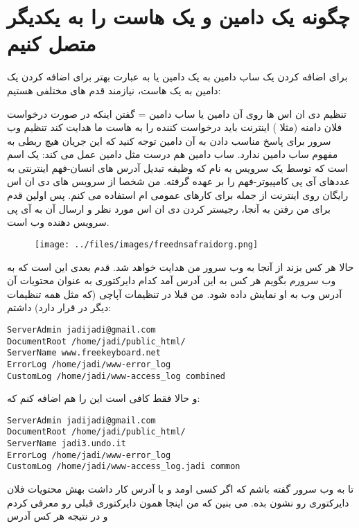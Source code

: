 \section{چگونه یک دامین و یک هاست را به یکدیگر متصل کنیم}
برای اضافه کردن یک ساب دامین به یک دامین یا به عبارت بهتر برای اضافه کردن یک دامین به یک هاست، نیازمند قدم های مختلفی هستیم:

تنظیم دی ان اس ها روی آن دامین یا ساب دامین = گفتن اینکه در صورت درخواست فلان دامنه (مثلا ) اینترنت باید درخواست کننده را به هاست ما هدایت کند
تنظیم وب سرور برای پاسخ مناسب دادن به آن دامین
توجه کنید که این جریان هیچ ربطی به مفهوم ساب دامین ندارد. ساب دامین هم درست مثل دامین عمل می کند: یک اسم است که توسط یک سرویس به نام  که وظیفه تبدیل آدرس های انسان-فهم اینترنتی به عددهای آی پی کامپیوتر-فهم را بر عهده گرفته. من شخصا از سرویس های دی ان اس رایگان روی اینترنت از جمله
\href{http://freedns.afraid.org}{}
  برای کارهای عمومی ام استفاده می کنم. پس اولین قدم برای من رفتن به آنجا، رجیستر کردن دی ان اس مورد نظر و ارسال آن به آی پی سرویس دهنده وب است.
\begin{figure}[H]
\texttt{[image: ../files/images/freednsafraidorg.png]}
\end{figure}
حالا هر کس بزند  از آنجا به وب سرور من هدایت خواهد شد. قدم بعدی این است که به وب سرورم بگویم هر کس به این آدرس آمد کدام دایرکتوری به عنوان محتویات آن آدرس وب به او نمایش داده شود. من قبلا در تنظیمات آپاچی (که مثل همه تنظیمات دیگر در
 قرار دارد) داشتم:
\begin{frameng}
\begin{lstlisting}
ServerAdmin jadijadi@gmail.com
DocumentRoot /home/jadi/public_html/
ServerName www.freekeyboard.net 
ErrorLog /home/jadi/www-error_log
CustomLog /home/jadi/www-access_log combined
\end{lstlisting}
\end{frameng}
و حالا فقط کافی است این را هم اضافه کنم که:
\begin{frameng}
\begin{lstlisting}
ServerAdmin jadijadi@gmail.com
DocumentRoot /home/jadi/public_html/
ServerName jadi3.undo.it
ErrorLog /home/jadi/www-error_log
CustomLog /home/jadi/www-access_log.jadi common
\end{lstlisting}
\end{frameng}
تا به وب سرور گفته باشم که اگر کسی اومد و با آدرس  کار داشت بهش محتویات فلان دایرکتوری رو نشون بده. می بنین که من اینجا همون دایرکتوری قبلی رو معرفی کردم و در نتیجه هر کس آدرس
\href{http://jadi3.undo.it}{}
